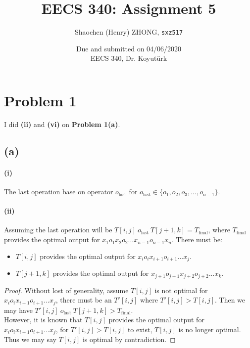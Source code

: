 \documentclass[11pt]{article}
\newcommand{\ilc}{\texttt}
\begin{document}
\title{\textbf{EECS 340: Assignment 5}}

\author{Shaochen (Henry) ZHONG, \ilc{sxz517}}
\date{Due and submitted on 04/06/2020 \\ EECS 340, Dr. Koyut{\"u}rk}
\maketitle

\section{Problem 1}

I did \textbf{(ii)} and \textbf{(vi)} on \textbf{Problem 1(a)}.
\subsection{(a)}

\paragraph{(i)}

The last operation base on operator $o_{\text{last}}$ for $o_{\text{last}} \in \{o_1, o_2, o_3, ..., o_{n-1}\}$.

\paragraph{(ii)} Assuming the last operation will be $T[i, j] \ o_{\text{last}} \ T[j+1, k] = T_{\text{final}}$, where $T_{\text{final}}$ provides the optimal output for $x_1 o_1 x_2 o_2 ... x_{n-1} o_{n-1} x_n$. There must be:


\begin{itemize}
    \item $T[i, j]$ provides the optimal output for $x_i o_i x_{i+1} o_{i+1} ... x_{j}$.
    \item $T[j+1, k]$ provides the optimal output for $x_{j+1} o_{j+1} x_{j+2} o_{j+2} ... x_{k}$.
\end{itemize}

\begin{proof}
    Without lost of generality, assume $T[i, j]$ is not optimal for $x_i o_i x_{i+1} o_{i+1} ... x_{j}$, there must be an $T'[i, j]$ where $T'[i, j] > T[i,j]$. Then we may have $T'[i, j] \ o_{\text{last}} \ T[j+1, k] > T_{\text{final}}$. \\
    However, it is known that $T[i, j]$ provides the optimal output for $x_i o_i x_{i+1} o_{i+1} ... x_{j}$, for $T'[i, j] > T[i,j]$ to exist,  $T[i, j]$ is no longer optimal. Thus we may say $T[i, j]$ is optimal by contradiction.
\end{proof}
\end{document}
